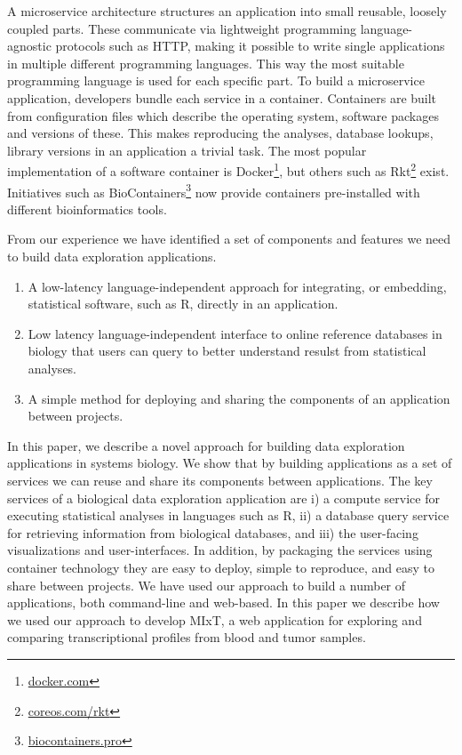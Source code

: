 A microservice architecture structures an application into small reusable,
loosely coupled parts. These communicate via lightweight programming
language-agnostic protocols such as HTTP, making it possible to write single
applications in multiple different programming languages. This way the
most suitable programming language is used for each specific part. To build a
microservice application, developers bundle each service in a container.
Containers are built from configuration files which describe the operating
system, software packages and versions of these. 
This makes reproducing the analyses, database lookups, library versions in an
application a trivial task. The most popular implementation of a software
container is Docker\footnote{\url{docker.com}}, but others such as
Rkt\footnote{\url{coreos.com/rkt}} exist. Initiatives such as
BioContainers\footnote{\url{biocontainers.pro}} now provide containers
pre-installed with different bioinformatics tools. 

From our experience we have identified a set of components and features we
need to build data exploration applications.

\begin{enumerate}
    \item A low-latency language-independent approach for integrating, or
        embedding, statistical software, such as R, directly in an application. 
    \item Low latency language-independent interface to online reference
        databases in biology that users can query to better understand resulst
        from statistical analyses. 
    \item A simple method for deploying and sharing the components of an
        application between projects. 
\end{enumerate} 


In this paper, we describe a novel approach for building data exploration
applications in systems biology. We show that by building applications as a set
of services we can reuse and share its components between applications. 
The key services of a biological data exploration application are i) a compute
service for executing statistical analyses in languages such as R, ii) a
database query service for retrieving information from biological databases, and
iii) the user-facing visualizations and user-interfaces. 
In addition, by packaging the services using container technology they are easy
to deploy, simple to reproduce, and easy to share between projects. 
We have
used our approach to build a number of applications, both command-line and
web-based. In this paper we describe how we used our approach to develop MIxT,
a web application for exploring and comparing transcriptional profiles from
blood and tumor samples. 
